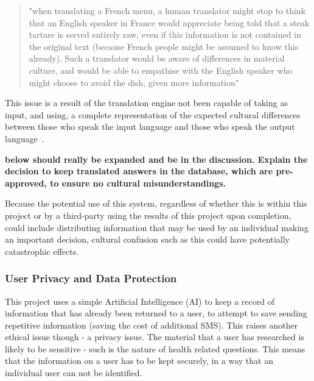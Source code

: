 \documentclass{article}
\begin{document}
\blockquote{"when translating a French menu, a human translator might stop to think that an English speaker in France would appreciate being told that a steak tartare is served entirely raw, even if this information is not contained in the original text (because French people might be assumed to know this already). Such a translator would be aware of differences in material culture, and would be able to empathise with the English speaker who might choose to avoid the dish, given more information"~\cite{melby2006can, kenny2011ethics}}

This issue is a result of the translation engine not been capable of taking as input, and using, a complete representation of the expected cultural differences between those who speak the input language and those who speak the output language~\cite{melby2006can}.

{\bf below should really be expanded and be in the discussion.  Explain the decision to keep translated answers in the database, which are pre-approved, to ensure no cultural misunderstandings.}

Because the potential use of this system, regardless of whether this is within this project or by a third-party using the results of this project upon completion, could include distributing information that may be used by an individual making an important decision, cultural confusion such as this could have potentially catastrophic effects.

\label{subsubsec:userPrivacyAndDataProtection}
\subsubsection{User Privacy and Data Protection}
This project uses a simple Artificial Intelligence (AI) to keep a record of information that has already been returned to a user, to attempt to save sending repetitive information (saving the cost of additional SMS).  This raises another ethical issue though - a privacy issue.  The material that a user has researched is likely to be sensitive - such is the nature of health related questions.  This means that the information on a user has to be kept securely, in a way that an individual user can not be identified.
\end{document}
